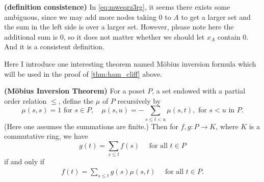 \documentclass{article}
\newcommand{\bfs}[1]{\textbf{({#1}) }}
\begin{document}
\begin{rema}\bfs{definition consistence}
In \cref{eq:mweqrz3rg}, it seems there exists some ambiguous, since we may add more nodes taking $0$ to $A$ to get a larger set and the sum in the left side is over a larger set. However, please note here the additional sum is $0$, so it does not matter whether we should let $x_A$ contain $0$. And it is a consistent definition.
\end{rema}
Here I introduce one interesting theorem named M\"obius inversion formula which will be used in the proof of \cref{thm:ham_cliff} above.
\begin{thma}\bfs{M\"obius Inversion Theorem}\label{thm:mobius}
For a poset $P$, a set endowed with a partial order relation $\leq$, define the  $\mu$ of $P$ recursively by 
$$\mu(s, s)=1 \text{  for  } s \in P, \quad \mu(s, u)=-\sum_{s \leq t< u} \mu(s, t), \text{ for }s<u \text{ in }P .$$
(Here one assumes the summations are finite.) Then for $f, g: P \rightarrow K$, where $K$ is a commutative ring, we have
$$g(t)=\sum_{s \leq t} f(s) \quad\text{ for all } t \in P$$
if and only if
\begin{align*}
f(t)=\sum_{s \leq t} g(s) \mu(s, t) \quad \text { for all } t \in P .
\end{align*}
\end{thma}
\end{document}
